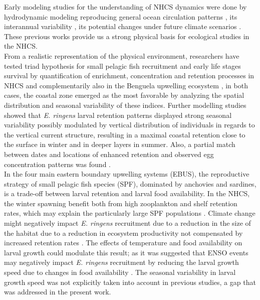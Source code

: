 Early modeling studies for the understanding of NHCS dynamics were done by hydrodynamic modeling reproducing general ocean circulation patterns \citep{PenvEche2005,ColaMcwi2012}, its interannual variability \citep{ColaCape2008,EspiEche2017}, its potential changes under future climate scenarios \citep{OerdCola2015,EcheGeva2020}. These previous works provide us a strong physical basis for ecological studies in the NHCS.\\

From a realistic representation of the physical environment, researchers have tested \cite{Baku1998} triad hypothesis for small pelagic fish recruitment and early life stages survival by quantification of enrichment, concentration and retention processes in NHCS \citep{LettPenv2007} and complementarily also in the Benguela upwelling ecosystem \citep{LettRoy2006}, in both cases, the coastal zone emerged as the most favorable by analyzing the spatial distribution and seasonal variability of these indices. Further modelling studies showed that \textit{E. ringens} larval retention patterns displayed strong seasonal variability possibly modulated by vertical distribution of individuals in regards to the vertical current structure, resulting in a maximal coastal retention close to the surface in winter and in deeper layers in summer. Also, a partial match between dates and locations of enhanced retention and observed egg concentration patterns was found \citep{BrocLett2008}.\\

In the four main eastern boundary upwelling systems (EBUS), the reproductive strategy of small pelagic fish species (SPF), dominated by anchovies and sardines, is a trade-off between larval retention and larval food availability. In the NHCS, the winter spawning benefit both from high zooplankton and shelf retention rates, which may explain the particularly  large SPF populations \citep{BrocCola2009,BrocLett2011}. Climate change might negatively impact \textit{E. ringens} recruitment due to a reduction in the size of the habitat due to a reduction in ecosystem productivity not compensated by increased retention rates \citep{BrocEche2013}. The effects of temperature and food availability on larval growth could modulate this result; as it was suggested that ENSO events may negatively impact \textit{E. ringens}  recruitment by reducing the larval growth speed due to changes in food availability \citep{XuChai2013,XuRose2015}. The seasonal variability in larval growth speed was not explicitly taken into account in previous studies, a gap that was addressed in the present work.\\

